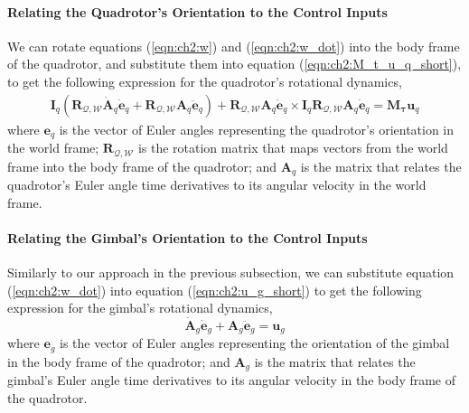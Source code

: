 \paragraph{Relating the Quadrotor's Orientation to the Control Inputs}

We can rotate equations (\ref{eqn:ch2:w}) and (\ref{eqn:ch2:w_dot}) into the body frame of the quadrotor, and substitute them into equation (\ref{eqn:ch2:M_t_u_q_short}), to get the following expression for the quadrotor's rotational dynamics,
%
\begin{equation}
\begin{aligned}
\mathbf{I}_{q} ( \mathbf{R}_{\mathcal{Q},\mathcal{W}} \dot{\mathbf{A}}_q \dot{\mathbf{e}}_q + \mathbf{R}_{\mathcal{Q},\mathcal{W}} \mathbf{A}_q \ddot{\mathbf{e}}_q ) + \mathbf{R}_{\mathcal{Q},\mathcal{W}} \mathbf{A}_q \dot{\mathbf{e}}_q \times \mathbf{I}_q \mathbf{R}_{\mathcal{Q},\mathcal{W}} \mathbf{A}_q \dot{\mathbf{e}}_q
=
\mathbf{M}_{\mathbf{\tau}} \mathbf{u}_q
\end{aligned}
\label{eqn:ch2:M_t_u_q_long}
\end{equation}
%
where
$\mathbf{e}_q$ is the vector of Euler angles representing the quadrotor's orientation in the world frame; 
$\mathbf{R}_{\mathcal{Q},\mathcal{W}}$ is the rotation matrix that maps vectors from the world frame into the body frame of the quadrotor;
and $\mathbf{A}_q$ is the matrix that relates the quadrotor's Euler angle time derivatives to its angular velocity in the world frame.

\paragraph{Relating the Gimbal's Orientation to the Control Inputs}

Similarly to our approach in the previous subsection, we can substitute equation (\ref{eqn:ch2:w_dot}) into equation (\ref{eqn:ch2:u_g_short}) to get the following expression for the gimbal's rotational dynamics,       
%
\begin{equation}
\dot{\mathbf{A}}_g \dot{\mathbf{e}}_g + \mathbf{A}_g \ddot{\mathbf{e}}_g = \mathbf{u}_g
\label{eqn:ch2:u_g_long}
\end{equation}
%
where
$\mathbf{e}_g$ is the vector of Euler angles representing the orientation of the gimbal in the body frame of the quadrotor;
and $\mathbf{A}_g$ is the matrix that relates the gimbal's Euler angle time derivatives to its angular velocity in the body frame of the quadrotor.

